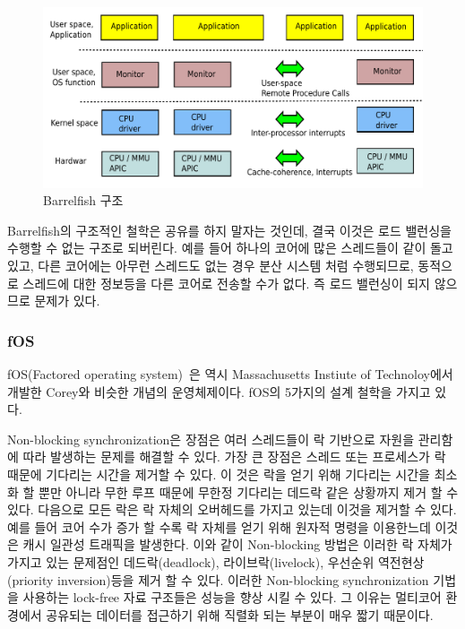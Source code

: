 \begin{figure}[h!]
    \centering
    \includegraphics[width=1\textwidth]{fig/multikernel/multikernel}
    \caption{Barrelfish 구조}
  \label{fig:Barrelfish}
\end{figure}

Barrelfish의 구조적인 철학은 공유를 하지 말자는 것인데, 결국 이것은 로드 밸런싱을 수행할 수 
없는 구조로 되버린다. 예를 들어 하나의 코어에 많은 스레드들이 같이 돌고 있고, 다른 코어에는 아무런 
스레드도 없는 경우 분산 시스템 처럼 수행되므로, 동적으로 스레드에 대한 정보등을 다른 코어로 전송할 수가 없다.
즉 로드 밸런싱이 되지 않으므로 문제가 있다.

\subsubsection{fOS}



fOS(Factored operating system)~\cite{Wentzlaff2010fOS}은 역시 Massachusetts
Instiute of Technoloy에서 개발한 Corey와 비슷한 개념의 운영체제이다.
fOS의 5가지의 설계 철학을 가지고 있다. 

Non-blocking synchronization은 장점은 여러 스레드들이 락 기반으로 자원을 관리함에 따라
 발생하는 문제를 해결할 수 있다. 
가장 큰 장점은 스레드 또는 프로세스가 락 때문에 기다리는 시간을 제거할 수 있다.
이 것은 락을 얻기 위해 기다리는 시간을 최소화 할 뿐만 아니라 무한 루프 때문에 무한정 기다리는 
데드락 같은 상황까지 제거 할 수 있다. 
다음으로 모든 락은 락 자체의 오버헤드를 가지고 있는데 이것을 제거할 수 있다. 
예를 들어 코어 수가 증가 할 수록 락 자체를 얻기 위해 원자적 명령을 이용한느데 이것은 캐시 일관성 트래픽을 
발생한다. 
이와 같이 Non-blocking 방법은 이러한 락 자체가 가지고 있는 문제점인 데드락(deadlock), 라이브락(livelock), 
우선순위 역전현상(priority inversion)등을 제거 할 수 있다. 
이러한 Non-blocking synchronization 기법을 사용하는 lock-free 자료 구조들은 성능을 향상 시킬 수 있다. 
그 이유는 멀티코어 환경에서 공유되는 데이터를 접근하기 위해 직렬화 되는 부분이 매우 짧기 때문이다. 

